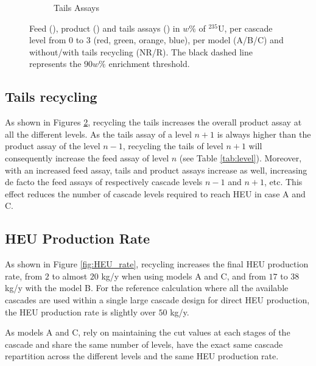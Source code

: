 \begin{figure}[h!]
\begin{subfigure}[t]{0.45\textwidth}
        \caption{Tails Assays}
        \label{sfig:tails_assay}
    \end{subfigure}
    \caption{Feed (), product
        () and tails assays ()
        in $w\%$ of $^{235}$U, per cascade level from 0 to 3 (red, green, orange,
        blue), per model (A/B/C) and without/with tails recycling (NR/R). The
        black dashed line represents the $90 w\%$ enrichment threshold.}
    \label{fig:assays}
\end{figure}



\subsection{Tails recycling}

As shown in Figures \ref{fig:assays}, recycling the tails increases the overall product assay at
all the different levels. As the tails assay of a level $n+1$ is always higher than
the product assay of the level $n-1$, recycling the tails of level $n+1$ will
consequently increase the feed assay of level $n$ (see Table \ref{tab:level}).
Moreover, with an increased feed assay, tails and product assays increase as
well, increasing de facto the feed assays of respectively cascade levels $n-1$
and $n+1$, etc.  This effect reduces the number of cascade levels required to reach
\gls{HEU} in case A and C.



\subsection{\gls{HEU} Production Rate}

As shown in Figure \ref{fig:HEU_rate}, recycling increases the final \gls{HEU}
production rate, from $2$ to almost $20$ kg/y when using models A and C, and from
$17$ to $38$ kg/y with the model B. For the reference calculation where all the
available cascades are used within a single large cascade design for direct
\gls{HEU} production, the \gls{HEU} production rate is slightly over $50$ kg/y.


As models A and C, rely on maintaining the cut values at each stages of the
cascade and share the same number of levels, have the exact same cascade
repartition across the different levels and the same \gls{HEU} production rate.

